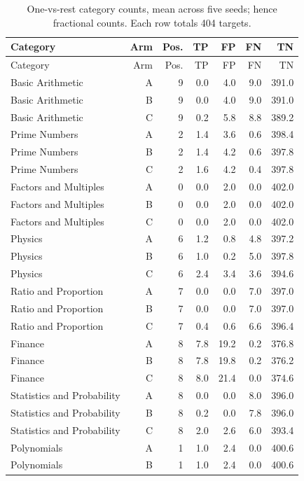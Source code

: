 \small\begin{longtable}{@{}lrrrrrr@{}}
\caption{One-vs-rest category counts, mean across five seeds; hence fractional counts. Each row totals 404 targets.}\label{tab:confusions}\\
\toprule Category & Arm & Pos. & TP & FP & FN & TN\\\midrule\endfirsthead
\toprule Category & Arm & Pos. & TP & FP & FN & TN\\\midrule\endhead
Basic Arithmetic & A & 9 & 0.0 & 4.0 & 9.0 & 391.0\\
Basic Arithmetic & B & 9 & 0.0 & 4.0 & 9.0 & 391.0\\
Basic Arithmetic & C & 9 & 0.2 & 5.8 & 8.8 & 389.2\\
Prime Numbers & A & 2 & 1.4 & 3.6 & 0.6 & 398.4\\
Prime Numbers & B & 2 & 1.4 & 4.2 & 0.6 & 397.8\\
Prime Numbers & C & 2 & 1.6 & 4.2 & 0.4 & 397.8\\
Factors and Multiples & A & 0 & 0.0 & 2.0 & 0.0 & 402.0\\
Factors and Multiples & B & 0 & 0.0 & 2.0 & 0.0 & 402.0\\
Factors and Multiples & C & 0 & 0.0 & 2.0 & 0.0 & 402.0\\
Physics & A & 6 & 1.2 & 0.8 & 4.8 & 397.2\\
Physics & B & 6 & 1.0 & 0.2 & 5.0 & 397.8\\
Physics & C & 6 & 2.4 & 3.4 & 3.6 & 394.6\\
Ratio and Proportion & A & 7 & 0.0 & 0.0 & 7.0 & 397.0\\
Ratio and Proportion & B & 7 & 0.0 & 0.0 & 7.0 & 397.0\\
Ratio and Proportion & C & 7 & 0.4 & 0.6 & 6.6 & 396.4\\
Finance & A & 8 & 7.8 & 19.2 & 0.2 & 376.8\\
Finance & B & 8 & 7.8 & 19.8 & 0.2 & 376.2\\
Finance & C & 8 & 8.0 & 21.4 & 0.0 & 374.6\\
Statistics and Probability & A & 8 & 0.0 & 0.0 & 8.0 & 396.0\\
Statistics and Probability & B & 8 & 0.2 & 0.0 & 7.8 & 396.0\\
Statistics and Probability & C & 8 & 2.0 & 2.6 & 6.0 & 393.4\\
Polynomials & A & 1 & 1.0 & 2.4 & 0.0 & 400.6\\
Polynomials & B & 1 & 1.0 & 2.4 & 0.0 & 400.6\\

\end{longtable}
